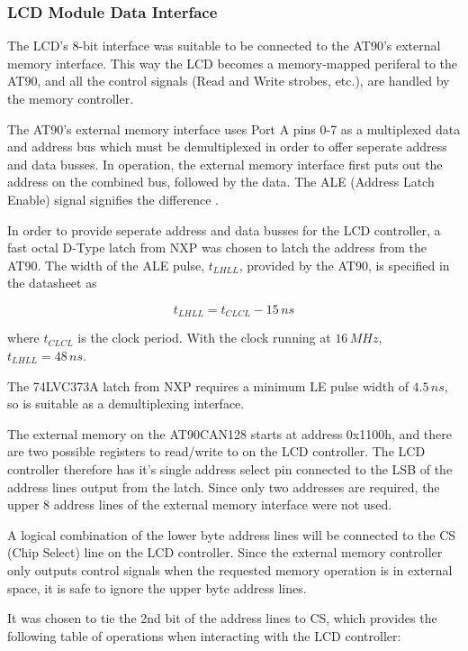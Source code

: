 \subsubsection{LCD Module Data Interface}

The LCD's 8-bit interface was suitable to be connected to the AT90's external memory interface. This way the LCD becomes a memory-mapped periferal to the AT90, and all the control signals (Read and Write strobes, etc.), are handled by the memory controller.

The AT90's external memory interface uses Port A pins 0-7 as a multiplexed data and address bus which must be demultiplexed in order to offer seperate address and data busses. In operation, the external memory interface first puts out the address on the combined bus, followed by the data. The ALE (Address Latch Enable) signal signifies the difference \cite{AT90CAN}.

In order to provide seperate address and data busses for the LCD controller, a fast octal D-Type latch from NXP was chosen to latch the address from the AT90. The width of the ALE pulse, $t_{LHLL}$, provided by the AT90, is specified in the datasheet as

\begin{equation}
t_{LHLL}=t_{CLCL}-15\, ns
\end{equation}

 where $t_{CLCL}$ is the clock period. With the clock running at $16\, MHz$, $t_{LHLL}=48\, ns$.

The 74LVC373A latch from NXP requires a minimum LE pulse width of $4.5\, ns$, so is suitable as a demultiplexing interface.

The external memory on the AT90CAN128 starts at address 0x1100h, and there are two possible registers to read/write to on the LCD controller. The LCD controller therefore has it's single address select pin connected to the LSB of the address lines output from the latch. Since only two addresses are required, the upper 8 address lines of the external memory interface were not used.

A logical combination of the lower byte address lines will be connected to the CS (Chip Select) line on the LCD controller. Since the external memory controller only outputs control signals when the requested memory operation is in external space, it is safe to ignore the upper byte address lines.

It was chosen to tie the 2nd bit of the address lines to CS, which provides the following table of operations when interacting with the LCD controller:


